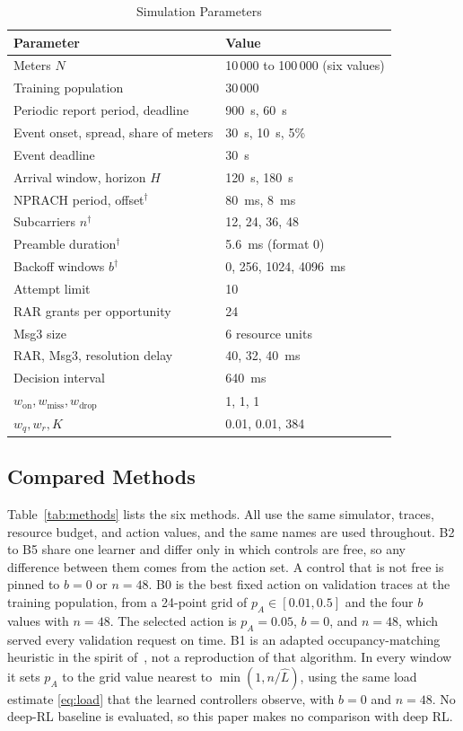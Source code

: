 \documentclass[conference]{IEEEtran}
\begin{document}
\begin{table}[!t]
\caption{Simulation Parameters}
\label{tab:params}
\centering
\begin{tabular}{@{}l l@{}}
\hline
\textbf{Parameter} & \textbf{Value} \\
\hline
Meters $N$ & 10\,000 to 100\,000 (six values) \\
Training population & 30\,000 \\
Periodic report period, deadline & 900~s, 60~s \\
Event onset, spread, share of meters & 30~s, 10~s, 5\% \\
Event deadline & 30~s \\
Arrival window, horizon $H$ & 120~s, 180~s \\
NPRACH period, offset$^\dagger$ & 80~ms, 8~ms \\
Subcarriers $n^\dagger$ & 12, 24, 36, 48 \\
Preamble duration$^\dagger$ & 5.6~ms (format 0) \\
Backoff windows $b^\dagger$ & 0, 256, 1024, 4096~ms \\
Attempt limit & 10 \\
RAR grants per opportunity & 24 \\
Msg3 size & 6 resource units \\
RAR, Msg3, resolution delay & 40, 32, 40~ms \\
Decision interval & 640~ms \\
$w_{\mathrm{on}}, w_{\mathrm{miss}}, w_{\mathrm{drop}}$ & 1, 1, 1 \\
$w_q, w_r, K$ & 0.01, 0.01, 384 \\
\hline
\end{tabular}
\end{table}

\subsection{Compared Methods}
Table~\ref{tab:methods} lists the six methods. All use the same simulator, traces,
resource budget, and action values, and the same names are used throughout. B2 to B5
share one learner and differ only in which controls are free, so any difference
between them comes from the action set. A control that is not free is pinned to
$b = 0$ or $n = 48$. B0 is the best fixed action on validation traces at the training
population, from a 24-point grid of $p_A \in [0.01, 0.5]$ and the four $b$ values with
$n = 48$. The selected action is $p_A = 0.05$, $b = 0$, and $n = 48$, which served
every validation request on time. B1 is an adapted occupancy-matching heuristic in the
spirit of~\cite{duan}, not a reproduction of that algorithm. In every window it sets
$p_A$ to the grid value nearest to $\min(1, n/\hat{L})$, using the same load estimate
\eqref{eq:load} that the learned controllers observe, with $b = 0$ and $n = 48$. No
deep-RL baseline is evaluated, so this paper makes no comparison with deep RL.
\end{document}
